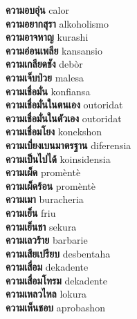 \textbf{ ความอบอุ่น  } calor \\
\textbf{ ความอยากสุรา  } alkoholismo \\
\textbf{ ความอาจหาญ  } kurashi \\
\textbf{ ความอ่อนเพลีย  } kansansio \\
\textbf{ ความเกลียดชัง  } debòr \\
\textbf{ ความเจ็บป่วย  } malesa \\
\textbf{ ความเชื่อมั่น  } konfiansa \\
\textbf{ ความเชื่อมั่นในตนเอง  } outoridat \\
\textbf{ ความเชื่อมั่นในตัวเอง  } outoridat \\
\textbf{ ความเชื่อมโยง  } konekshon \\
\textbf{ ความเบี่ยงเบนมาตรฐาน  } diferensia \\
\textbf{ ความเป็นไปได้  } koinsidensia \\
\textbf{ ความเผ็ด  } promèntè \\
\textbf{ ความเผ็ดร้อน  } promèntè \\
\textbf{ ความเมา  } buracheria \\
\textbf{ ความเย็น  } friu \\
\textbf{ ความเย็นชา  } sekura \\
\textbf{ ความเลวร้าย  } barbarie \\
\textbf{ ความเสียเปรียบ  } desbentaha \\
\textbf{ ความเสื่อม  } dekadente \\
\textbf{ ความเสื่อมโทรม  } dekadente \\
\textbf{ ความเหลวไหล  } lokura \\
\textbf{ ความเห็นชอบ  } aprobashon \\
